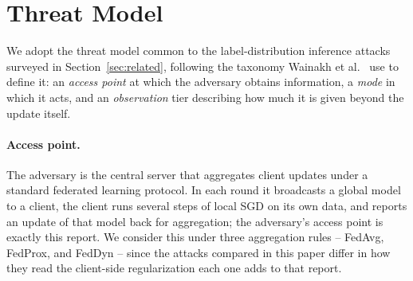%

\section{Threat Model}
\label{sec:threat}

We adopt the threat model common to the label-distribution inference
attacks surveyed in Section~\ref{sec:related}, following the taxonomy
Wainakh et al.~\cite{wainakh2022llg} use to define it: an \emph{access
point} at which the adversary obtains information, a \emph{mode} in which
it acts, and an \emph{observation} tier describing how much it is given
beyond the update itself.

\paragraph{Access point.}
The adversary is the central server that aggregates client updates under a
standard federated learning protocol. In each round it broadcasts a global
model to a client, the client runs several steps of local SGD on its own
data, and reports an update of that model back for aggregation; the
adversary's access point is exactly this report. We consider this under
three aggregation rules -- FedAvg, FedProx, and FedDyn -- since the attacks
compared in this paper differ in how they read the client-side
regularization each one adds to that report.

